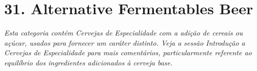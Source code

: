 \section*{31. Alternative Fermentables Beer}
\textit{Esta categoria contém Cervejas de Especialidade com a adição de cereais ou açúcar, usados para fornecer um caráter distinto. Veja a sessão Introdução a Cervejas de Especialidade para mais comentários, particularmente referente ao equilíbrio dos ingredientes adicionados à cerveja base.}
